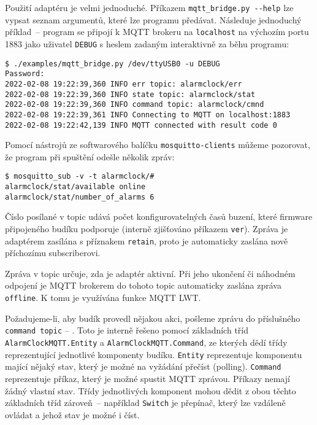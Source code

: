 Použití adaptéru je velmi jednoduché. Příkazem \verb|mqtt_bridge.py --help|
lze vypsat seznam argumentů, které lze programu předávat.
Následuje jednoduchý příklad~-- program se připojí k MQTT brokeru na
\texttt{localhost} na výchozím portu 1883 jako uživatel \texttt{DEBUG} s heslem
zadaným interaktivně za běhu programu:
\begin{lstlisting}[style=terminal]
$ ./examples/mqtt_bridge.py /dev/ttyUSB0 -u DEBUG
Password:
2022-02-08 19:22:39,360 INFO err topic: alarmclock/err
2022-02-08 19:22:39,360 INFO state topic: alarmclock/stat
2022-02-08 19:22:39,360 INFO command topic: alarmclock/cmnd
2022-02-08 19:22:39,361 INFO Connecting to MQTT on localhost:1883
2022-02-08 19:22:42,139 INFO MQTT connected with result code 0

\end{lstlisting}

Pomocí nástrojů ze softwarového balíčku \texttt{mosquitto-clients}
můžeme pozorovat, že program při spuštění odešle několik zpráv:
\begin{lstlisting}[style=terminal]
$ mosquitto_sub -v -t alarmclock/#
alarmclock/stat/available online
alarmclock/stat/number_of_alarms 6
\end{lstlisting}
Číslo posílané v topic  udává počet
konfigurovatelných časů buzení, které firmware připojeného budíku podporuje
(interně zjišťováno příkazem \texttt{ver}). Zpráva je adaptérem zasílána
s příznakem \texttt{retain}, proto je automaticky zaslána nově příchozímu
subscriberovi.

Zpráva v topic  určuje, zda je adaptér
aktivní. Při jeho ukončení či náhodném odpojení je MQTT brokerem do tohoto
topic automaticky zaslána zpráva \texttt{offline}. K tomu je využívána funkce
MQTT \ac{LWT}.

Požadujeme-li, aby budík provedl nějakou akci, pošleme zprávu do příslušného
\texttt{command topic} -- .
Toto je interně řešeno pomocí základních tříd \texttt{AlarmClockMQTT.Entity}
a \texttt{AlarmClockMQTT.Command}, ze kterých dědí třídy reprezentující
jednotlivé komponenty budíku. \texttt{Entity} reprezentuje komponentu mající
nějaký stav, který je možné na vyžádání přečíst
(\foreignlanguage{english}{polling}). \texttt{Command} reprezentuje příkaz,
který je možné spustit MQTT zprávou. Příkazy nemají žádný vlastní stav.
Třídy jednotlivých komponent mohou dědit z obou těchto základních tříd
zároveň~-- například \texttt{Switch} je přepínač, který lze vzdáleně ovládat
a jehož stav je možné i číst.

